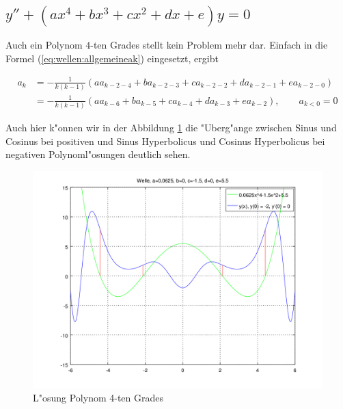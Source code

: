 \subsection{\texorpdfstring{$y''+(ax^4+bx^3+cx^2+dx+e)y = 
0$}{y''-(ax4+bx3+cx2+dx+e)y = 0}}

Auch ein Polynom $4$-ten Grades stellt kein Problem mehr dar. Einfach in die 
Formel (\ref{eq:wellen:allgemeineak}) eingesetzt, ergibt

\begin{equation*}
	\begin{split}
		a_k &= -\frac{1}{k(k-1)} (aa_{k-2-4} + 
		ba_{k-2-3} + ca_{k-2-2} + da_{k-2-1} +ea_{k-2-0})
		\\
		&= -\frac{1}{k(k-1)} (aa_{k-6} + ba_{k-5} + 
		ca_{k-4} + da_{k-3} +ea_{k-2}), \qquad a_{k<0} = 0
	\end{split}
\end{equation*}

Auch hier k"onnen wir in der Abbildung \ref{fig:wellen:poly4-dgl} die 
"Uberg"ange zwischen Sinus und Cosinus bei positiven und Sinus Hyperbolicus und 
Cosinus Hyperbolicus bei negativen Polynoml"osungen deutlich sehen.

\begin{figure}
	\includegraphics[scale=0.65]{./wellen/images/allgemein/n4.png}
	\caption{L"osung Polynom 4-ten Grades}
	\label{fig:wellen:poly4-dgl}
\end{figure}